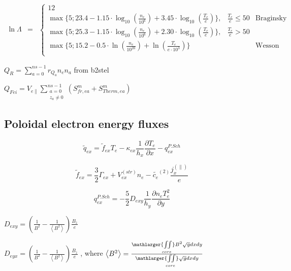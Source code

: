 \documentclass[a4paper,10pt]{report}
\begin{document}
$
\begin{matrix}
\ln \Lambda & =
& \left\{
\begin{matrix}
12 \\
\max \{ 5; 23.4 - 1.15 \cdot \log_{10} \left( \frac{n_e}{10^6} \right) + 3.45 \cdot \log_{10} \left( \frac{T_e}e \right)  \}, & \frac{T_e}{e} \leq 50 & \text{Braginsky formula} \\
\max \{ 5; 25.3 - 1.15 \cdot \log_{10} \left( \frac{n_e}{10^6} \right) + 2.30 \cdot \log_{10} \left( \frac{T_e}e \right)  \}, & \frac{T_e}{e} > 50  \\
\max \{ 5; 15.2 - 0.5 \cdot \ln \left( \frac{n_e}{10^{20}} \right) + \ln \left( \frac{T_e}{e \cdot 10^3} \right)  \} && \text{Wesson formula for electron-ion collisions} \\
\end{matrix} \right.
\end{matrix}
$

$Q_R = \sum \limits_{a=0}^{ns-1} r_{Q_a} n_e n_a$ from b2stel

$Q_{Fei} = V_{e \parallel} \sum \limits_{\substack{a=0 \\ z_a \neq 0}}^{ns - 1}
\left( S^m_{fr,ea} + S^m_{Therm,ea} \right)$


\subsection{Poloidal electron energy fluxes}

\begin{equation*}
\widetilde{q}_{ex} = \widetilde{f}_{ex} T_e - \kappa_{ex} \frac 1{h_x} \frac{\partial T_e} {\partial x} - q_{ex}^{P.Sch}
\end{equation*}

\begin{equation*}
\widetilde{f}_{ex} = \frac 3 2 \Gamma_{ex} + V_{ex}^{(str)} n_e - \widetilde{c_e}^{(2)} \frac{j^{ \left( \parallel \right) }_x}e
\end{equation*}

\begin{equation*}
q_{ex}^{P.Sch} = -\frac 5 2 D_{exy} \frac 1{h_y} \frac{\partial n_e T_e^2} {\partial y}
\end{equation*}


$D_{exy} = \left( \frac 1{B^2} - \frac 1{\left\langle B^2 \right\rangle} \right) \frac{B_z} e$

$D_{eyx} = \left( \frac 1{B^2} - \frac 1{\left\langle B^2 \right\rangle} \right) \frac{B_z} e$
, where $\left\langle B^2 \right\rangle = \frac{\mathlarger{\iint \limits_{core}} B^2 \sqrt g dxdy}
{\mathlarger{\iint \limits_{core}} \sqrt g dxdy}$
\end{document}
